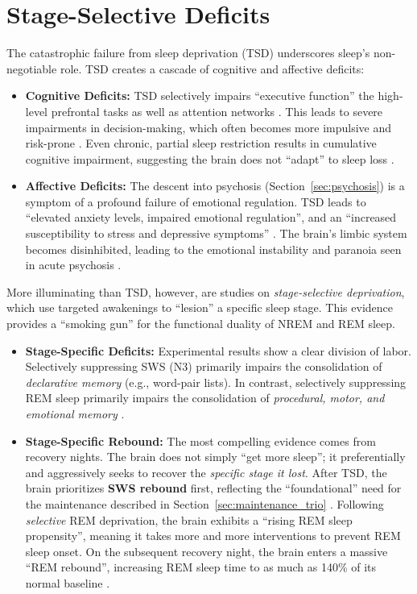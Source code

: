 \section{Stage-Selective Deficits}\label{sec:stage_deficits}

The catastrophic failure from sleep deprivation (TSD) underscores sleep's non-negotiable role. TSD creates a cascade of cognitive and affective deficits:

\begin{itemize}
    \item \textbf{Cognitive Deficits:} TSD selectively impairs ``executive function'' \- the high-level prefrontal tasks \- as well as attention networks \citep{ren2025, lim2024}. This leads to severe impairments in decision-making, which often becomes more impulsive and risk-prone \citep{lim2024}. Even chronic, partial sleep restriction results in cumulative cognitive impairment, suggesting the brain does not ``adapt'' to sleep loss \citep{ren2025}.
    \item \textbf{Affective Deficits:} The descent into psychosis (Section~\ref{sec:psychosis}) is a symptom of a profound failure of emotional regulation. TSD leads to ``elevated anxiety levels, impaired emotional regulation'', and an ``increased susceptibility to stress and depressive symptoms'' \citep{shah2025, oleary2017}. The brain's limbic system becomes disinhibited, leading to the emotional instability and paranoia seen in acute psychosis \citep{shah2025}.
\end{itemize}

More illuminating than TSD, however, are studies on \textit{stage-selective deprivation}, which use targeted awakenings to ``lesion'' a specific sleep stage. This evidence provides a ``smoking gun'' for the functional duality of NREM and REM sleep.

\begin{itemize}
    \item \textbf{Stage-Specific Deficits:} Experimental results show a clear division of labor. Selectively suppressing SWS (N3) primarily impairs the consolidation of \textit{declarative memory} (e.g., word-pair lists). In contrast, selectively suppressing REM sleep primarily impairs the consolidation of \textit{procedural, motor, and emotional memory} \citep{genzel2014}.
    \item \textbf{Stage-Specific Rebound:} The most compelling evidence comes from recovery nights. The brain does not simply ``get more sleep''; it preferentially and aggressively seeks to recover the \textit{specific stage it lost}. After TSD, the brain prioritizes \textbf{SWS rebound} first, reflecting the ``foundational'' need for the maintenance described in Section~\ref{sec:maintenance_trio} \citep{benington1999}. Following \textit{selective} REM deprivation, the brain exhibits a ``rising REM sleep propensity'', meaning it takes more and more interventions to prevent REM sleep onset. On the subsequent recovery night, the brain enters a massive ``REM rebound'', increasing REM sleep time to as much as 140\% of its normal baseline \citep{endo1998}.
\end{itemize}

